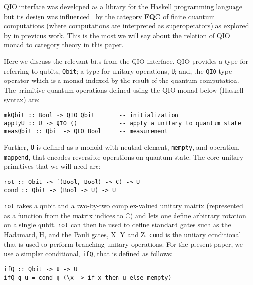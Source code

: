 \documentclass[acmsmall,nonacm,timestamp,review=false,anonymous=false]{acmart}
\begin{document}
QIO interface was developed as a library for the Haskell programming language but its design was influenced~\cite{asg2010} by the category \textbf{FQC} of finite quantum computations (where computations are interpreted as superoperators) as explored by \citet{fqc06} in previous work. This is the most we will say about the relation of QIO monad to category theory in this paper.

Here we discuss the relevant bits from the QIO interface. QIO provides a type for referring to qubits, \texttt{Qbit}; a type for unitary operations, \texttt{U}; and, the \texttt{QIO} type operator which is a monad indexed by the result of the quantum computation. The primitive quantum operations defined using the QIO monad below (Haskell syntax) are:

\begin{minipage}{0.95\linewidth}
\begin{lstlisting}[language=QHaskell]
mkQbit :: Bool -> QIO Qbit       -- initialization
applyU :: U -> QIO ()            -- apply a unitary to quantum state
measQbit :: Qbit -> QIO Bool     -- measurement
\end{lstlisting}
\end{minipage}

Further, \texttt{U} is defined as a monoid with neutral element, \texttt{mempty}, and operation, \texttt{mappend}, that encodes reversible operations on quantum state. The core unitary primitives that we will need are:

\begin{minipage}{0.95\linewidth}
\begin{lstlisting}[language=QHaskell]
rot :: Qbit -> ((Bool, Bool) -> C) -> U
cond :: Qbit -> (Bool -> U) -> U
\end{lstlisting}
\end{minipage}

\texttt{rot} takes a qubit and a two-by-two complex-valued unitary matrix (represented as a function from the matrix indices to $\mathbb{C}$) and lets one define arbitrary rotation on a single qubit. \texttt{rot} can then be used to define standard gates such as the Hadamard, H, and the Pauli gates, X, Y and Z. \texttt{cond} is the unitary conditional that is used to perform branching unitary operations. For the present paper, we use a simpler conditional, \texttt{ifQ}, that is defined as follows:

\begin{minipage}{0.95\linewidth}
\begin{lstlisting}[language=QHaskell]
ifQ :: Qbit -> U -> U
ifQ q u = cond q (\x -> if x then u else mempty)
\end{lstlisting}
\end{minipage}
\end{document}
